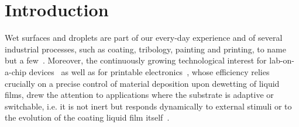 \documentclass[twocolumn,amsmath,amssymb,showpacs,pre,nofootinbib,superscriptaddress]{revtex4-1} %
\begin{document}
\maketitle

\newcommand{\ts}{\textsuperscript}

\section{Introduction}\label{sec:intro}
Wet surfaces and droplets are part of our every-day experience and of several industrial processes,
such as coating, tribology, painting and printing,
to name but a few~\cite{gross1980fluid,szeri2010fluid,DERYCK1998278,doi:10.1146/annurev.fluid.31.1.347,DASILVASOBRINHO19991204,singh2010inkjet,jo2009evaluation}. 
Moreover, the continuously growing technological interest for lab-on-a-chip devices~\cite{C6LC00387G,Focke} as well as for
printable electronics~\cite{Kim_2005, Luechinger_2008}, whose efficiency relies crucially on a precise control of material deposition upon dewetting of
liquid films, drew the attention to applications where the substrate is adaptive or switchable, i.e. it is not inert but responds
dynamically to external stimuli or to the evolution of the coating liquid film itself~\cite{doi:10.1126/science.288.5471.1624, doi:10.1246/bcsj.20180076, xin2010reversibly}.
\end{document}
